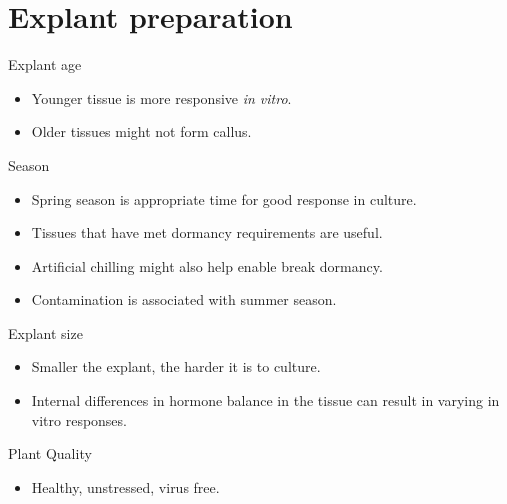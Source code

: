 \documentclass[
  ignorenonframetext,
  aspectratio=169]{beamer}
\providecommand{\tightlist}{%
  \setlength{\itemsep}{0pt}\setlength{\parskip}{0pt}}
\begin{document}
\hypertarget{explant-preparation}{%
\section{Explant preparation}\label{explant-preparation}}

\begin{frame}{Explant age}
\protect\hypertarget{explant-age}{}
\begin{itemize}
\tightlist
\item
  Younger tissue is more responsive \emph{in vitro}.
\item
  Older tissues might not form callus.
\end{itemize}
\end{frame}

\begin{frame}{Season}
\protect\hypertarget{season}{}
\begin{itemize}
\tightlist
\item
  Spring season is appropriate time for good response in culture.
\item
  Tissues that have met dormancy requirements are useful.
\item
  Artificial chilling might also help enable break dormancy.
\item
  Contamination is associated with summer season.
\end{itemize}
\end{frame}

\begin{frame}{Explant size}
\protect\hypertarget{explant-size}{}
\begin{itemize}
\tightlist
\item
  Smaller the explant, the harder it is to culture.
\item
  Internal differences in hormone balance in the tissue can result in
  varying in vitro responses.
\end{itemize}
\end{frame}

\begin{frame}{Plant Quality}
\protect\hypertarget{plant-quality}{}
\begin{itemize}
\tightlist
\item
  Healthy, unstressed, virus free.
\end{itemize}
\end{frame}
\end{document}
